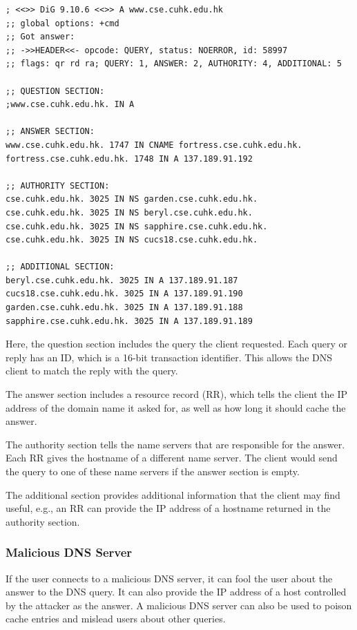 \begin{verbatim}
; <<>> DiG 9.10.6 <<>> A www.cse.cuhk.edu.hk
;; global options: +cmd
;; Got answer:
;; ->>HEADER<<- opcode: QUERY, status: NOERROR, id: 58997
;; flags: qr rd ra; QUERY: 1, ANSWER: 2, AUTHORITY: 4, ADDITIONAL: 5

;; QUESTION SECTION:
;www.cse.cuhk.edu.hk. IN A

;; ANSWER SECTION:
www.cse.cuhk.edu.hk. 1747 IN CNAME fortress.cse.cuhk.edu.hk.
fortress.cse.cuhk.edu.hk. 1748 IN A 137.189.91.192

;; AUTHORITY SECTION:
cse.cuhk.edu.hk. 3025 IN NS garden.cse.cuhk.edu.hk.
cse.cuhk.edu.hk. 3025 IN NS beryl.cse.cuhk.edu.hk.
cse.cuhk.edu.hk. 3025 IN NS sapphire.cse.cuhk.edu.hk.
cse.cuhk.edu.hk. 3025 IN NS cucs18.cse.cuhk.edu.hk.

;; ADDITIONAL SECTION:
beryl.cse.cuhk.edu.hk. 3025 IN A 137.189.91.187
cucs18.cse.cuhk.edu.hk. 3025 IN A 137.189.91.190
garden.cse.cuhk.edu.hk. 3025 IN A 137.189.91.188
sapphire.cse.cuhk.edu.hk. 3025 IN A 137.189.91.189
\end{verbatim}

Here, the question section includes the query the client requested. Each query or reply has an ID, which is a 16-bit transaction identifier. This allows the DNS client to match the reply with the query. 

The answer section includes a resource record (RR), which tells the client the IP address of the domain name it asked for, as well as how long it should cache the answer. 

The authority section tells the name servers that are responsible for the answer. Each RR gives the hostname of a different name server. The client would send the query to one of these name servers if the answer section is empty. 

The additional section provides additional information that the client may find useful, e.g., an RR can provide the IP address of a hostname returned in the authority section. 

\subsubsection{Malicious DNS Server}
If the user connects to a malicious DNS server, it can fool the user about the answer to the DNS query. It can also provide the IP address of a host controlled by the attacker as the answer. A malicious DNS server can also be used to poison cache entries and mislead users about other queries. 

